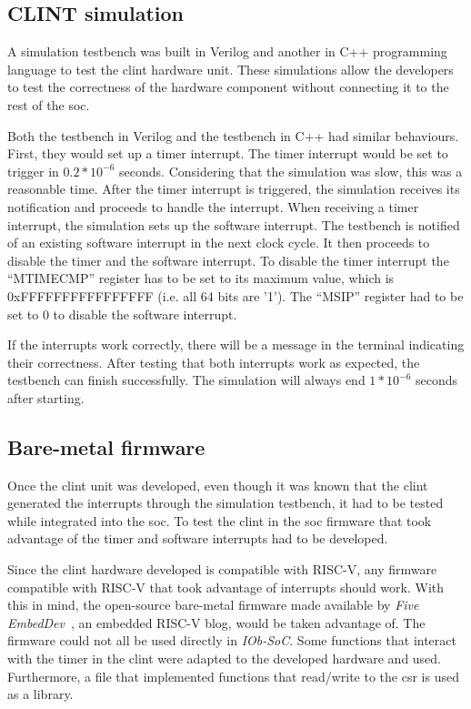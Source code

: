 \subsection{CLINT simulation}
A simulation testbench was built in Verilog and another in C++ programming language to test the \acrshort{clint} hardware unit. These simulations allow the developers to test the correctness of the hardware component without connecting it to the rest of the \acrshort{soc}.

Both the testbench in Verilog and the testbench in C++ had similar behaviours. First, they would set up a timer interrupt. The timer interrupt would be set to trigger in $0.2*10^{-6}$ seconds. Considering that the simulation was slow, this was a reasonable time. After the timer interrupt is triggered, the simulation receives its notification and proceeds to handle the interrupt. When receiving a timer interrupt, the simulation sets up the software interrupt. The testbench is notified of an existing software interrupt in the next clock cycle. It then proceeds to disable the timer and the software interrupt. To disable the timer interrupt the \enquote{MTIMECMP} register has to be set to its maximum value, which is 0xFFFFFFFFFFFFFFFF (i.e. all 64 bits are '1'). The \enquote{MSIP} register had to be set to 0 to disable the software interrupt.

If the interrupts work correctly, there will be a message in the terminal indicating their correctness. After testing that both interrupts work as expected, the testbench can finish successfully. The simulation will always end $1*10^{-6}$ seconds after starting.

\subsection{Bare-metal firmware}
Once the \acrshort{clint} unit was developed, even though it was known that the \acrshort{clint} generated the interrupts through the simulation testbench, it had to be tested while integrated into the \acrshort{soc}. To test the \acrshort{clint} in the \acrshort{soc} firmware that took advantage of the timer and software interrupts had to be developed.

Since the \acrshort{clint} hardware developed is compatible with RISC-V, any firmware compatible with RISC-V that took advantage of interrupts should work. With this in mind, the open-source bare-metal firmware made available by \textit{Five EmbedDev}~\cite{bare_metal_int}, an embedded RISC-V blog, would be taken advantage of. The firmware could not all be used directly in \textit{IOb-SoC}. Some functions that interact with the timer in the \acrshort{clint} were adapted to the developed hardware and used. Furthermore, a file that implemented functions that read/write to the \acrlong{csr} is used as a library.

